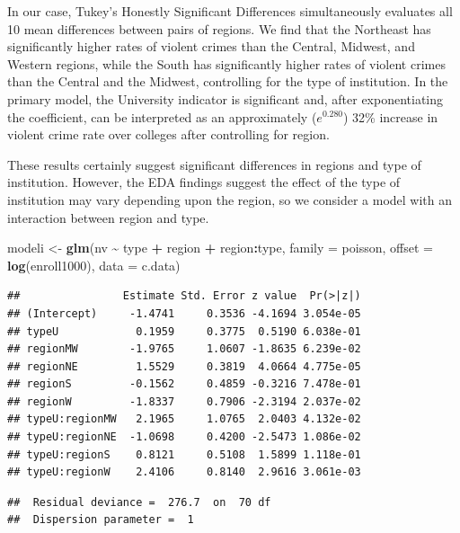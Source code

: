 \documentclass[
]{krantz}
\newenvironment{Shaded}{\begin{snugshade}}{\end{snugshade}}
\newcommand{\AttributeTok}[1]{\textcolor[rgb]{0.27,0.27,0.27}{#1}}
\newcommand{\FunctionTok}[1]{\textcolor[rgb]{0.27,0.27,0.27}{\textbf{#1}}}
\newcommand{\NormalTok}[1]{#1}
\newcommand{\OtherTok}[1]{\textcolor[rgb]{0.37,0.37,0.37}{#1}}
\newcommand{\SpecialCharTok}[1]{\textcolor[rgb]{0.43,0.43,0.43}{\textbf{#1}}}
\begin{document}
In our case, Tukey's Honestly Significant Differences simultaneously evaluates all 10 mean differences between pairs of regions. We find that the Northeast has significantly higher rates of violent crimes than the Central, Midwest, and Western regions, while the South has significantly higher rates of violent crimes than the Central and the Midwest, controlling for the type of institution. In the primary model, the University indicator is significant and, after exponentiating the coefficient, can be interpreted as an approximately (\(e^{0.280}\)) 32\% increase in violent crime rate over colleges after controlling for region.

These results certainly suggest significant differences in regions and type of institution. However, the EDA findings suggest the effect of the type of institution may vary depending upon the region, so we consider a model with an interaction between region and type.

\begin{Shaded}
\begin{Highlighting}[]
\NormalTok{modeli }\OtherTok{\textless{}{-}} \FunctionTok{glm}\NormalTok{(nv }\SpecialCharTok{\textasciitilde{}}\NormalTok{ type }\SpecialCharTok{+}\NormalTok{ region }\SpecialCharTok{+}\NormalTok{ region}\SpecialCharTok{:}\NormalTok{type, }
              \AttributeTok{family =}\NormalTok{ poisson,}
              \AttributeTok{offset =} \FunctionTok{log}\NormalTok{(enroll1000), }\AttributeTok{data =}\NormalTok{ c.data)}
\end{Highlighting}
\end{Shaded}

\begin{verbatim}
##                Estimate Std. Error z value  Pr(>|z|)
## (Intercept)     -1.4741     0.3536 -4.1694 3.054e-05
## typeU            0.1959     0.3775  0.5190 6.038e-01
## regionMW        -1.9765     1.0607 -1.8635 6.239e-02
## regionNE         1.5529     0.3819  4.0664 4.775e-05
## regionS         -0.1562     0.4859 -0.3216 7.478e-01
## regionW         -1.8337     0.7906 -2.3194 2.037e-02
## typeU:regionMW   2.1965     1.0765  2.0403 4.132e-02
## typeU:regionNE  -1.0698     0.4200 -2.5473 1.086e-02
## typeU:regionS    0.8121     0.5108  1.5899 1.118e-01
## typeU:regionW    2.4106     0.8140  2.9616 3.061e-03
\end{verbatim}

\begin{verbatim}
##  Residual deviance =  276.7  on  70 df 
##  Dispersion parameter =  1
\end{verbatim}
\end{document}

